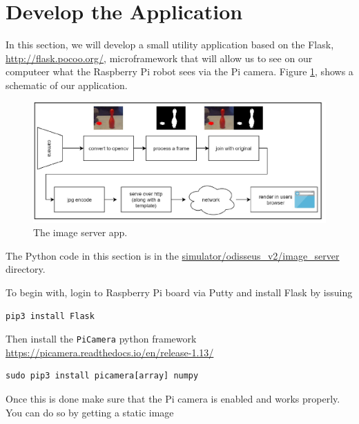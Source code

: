 \section{Develop the Application}
\label{create_flask_image_server}

In this section, we will develop a  small utility application based on the  Flask, \url{http://flask.pocoo.org/}, microframework that will allow us
to see on our computeer what the Raspberry Pi robot sees via the Pi camera.
Figure \ref{image_server_app}, shows a schematic of our application.

\begin{figure}[!htb]
\begin{center}
\includegraphics[scale=0.280]{img/raspberrypi/image_server_app.jpeg}
\end{center}
\caption{The image server app.}
\label{image_server_app}
\end{figure}


\begin{framed}
\begin{remark}

The Python code in this section is in  the \url{simulator/odisseus_v2/image_server} directory.
\end{remark}
\end{framed}

To begin with, login to Raspberry Pi board via Putty and install Flask by issuing

\begin{lstlisting}
pip3 install Flask
\end{lstlisting}

Then install the \lstinline{PiCamera} python framework \url{https://picamera.readthedocs.io/en/release-1.13/} 

\begin{lstlisting}
sudo pip3 install picamera[array] numpy
\end{lstlisting}

Once this is done make sure that the Pi camera is enabled and works properly. You can do so by getting a static image

